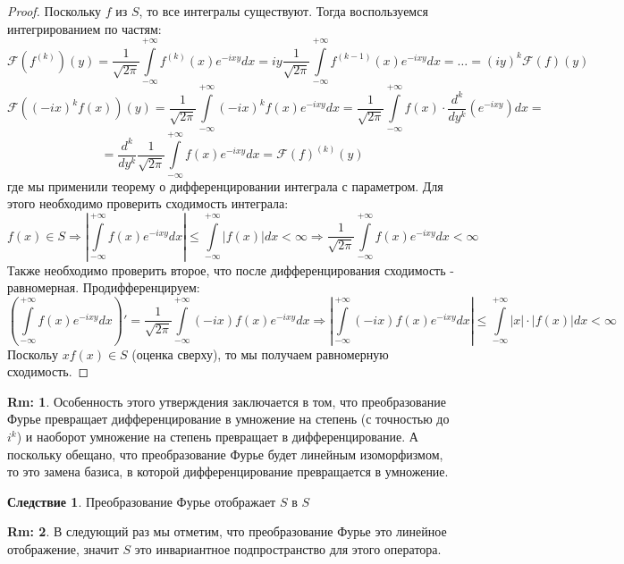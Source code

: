 \documentclass[12pt]{article}
\theoremstyle{definition}
\newtheorem{rem}{Rm:}
\newtheorem{corollary}{Следствие}
\newcommand{\ddint}[2]{\displaystyle\int\limits_{#1}^{#2}}
\newcommand{\fourt}[1]{\mathcal{F}\left(#1\right)}
\begin{document}
\begin{proof}
	Поскольку $f$ из $S$, то все интегралы существуют. Тогда воспользуемся интегрированием по частям:
	$$
		\fourt{f^{(k)}}(y) =  \dfrac{1}{\sqrt{2\pi}}\ddint{-\infty}{+\infty}f^{(k)}(x)e^{-ixy}dx = iy\dfrac{1}{\sqrt{2\pi}}\ddint{-\infty}{+\infty}f^{(k-1)}(x)e^{-ixy}dx = \dotsc = (iy)^{k}\fourt{f}(y)
	$$
	$$
		\fourt{(-ix)^kf(x)}(y) = \dfrac{1}{\sqrt{2\pi}}\ddint{-\infty}{+\infty}(-ix)^kf(x)e^{-ixy}dx = \dfrac{1}{\sqrt{2\pi}}\ddint{-\infty}{+\infty}f(x){\cdot}\dfrac{d^k}{d y^k} (e^{-ixy})dx	= 
	$$
	$$	
		= \dfrac{d^k}{d y^k}	\dfrac{1}{\sqrt{2\pi}}\ddint{-\infty}{+\infty}f(x)e^{-ixy}dx = \fourt{f}^{(k)}(y)
	$$
	где мы применили теорему о дифференцировании интеграла с параметром. Для этого необходимо проверить сходимость интеграла:
	$$
		f(x) \in S \Rightarrow \left|\ddint{-\infty}{+\infty}f(x)e^{-ixy}dx \right| \leq \ddint{-\infty}{+\infty}|f(x)|dx < \infty \Rightarrow \dfrac{1}{\sqrt{2\pi}}\ddint{-\infty}{+\infty}f(x)e^{-ixy}dx < \infty
	$$
	Также необходимо проверить второе, что после дифференцирования сходимость - равномерная. Продифференцируем:
	$$
		\left(\ddint{-\infty}{+\infty}f(x)e^{-ixy}dx\right)' = \dfrac{1}{\sqrt{2\pi}}\ddint{-\infty}{+\infty}(-ix)f(x)e^{-ixy}dx \Rightarrow  \left|\ddint{-\infty}{+\infty}(-ix)f(x)e^{-ixy}dx\right| \leq \ddint{-\infty}{+\infty}|x|{\cdot}|f(x)|dx < \infty
	$$
	Поскольу $xf(x) \in S$ (оценка сверху), то мы получаем равномерную сходимость.
\end{proof}
\begin{rem}
	Особенность этого утверждения заключается в том, что преобразование Фурье превращает дифференцирование в умножение на степень (с точностью до $i^k$) и наоборот умножение на степень превращает в дифференцирование. А поскольку обещано, что преобразование Фурье будет линейным изоморфизмом, то это замена базиса, в которой дифференцирование превращается в умножение.
\end{rem}

\begin{corollary}
	Преобразование Фурье отображает $S$ в $S$
\end{corollary}

\begin{rem}
	В следующий раз мы отметим, что преобразование Фурье это линейное отображение, значит $S$ это инвариантное подпространство для этого оператора.
\end{rem}
\end{document}
